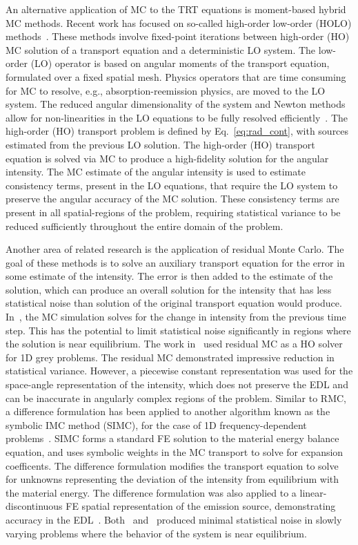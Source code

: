 An alternative application of MC to the TRT equations is moment-based hybrid MC methods.
Recent work has focused on so-called high-order low-order (HOLO)
methods~\cite{willert,park,rmc,ans_2014}. These methods involve fixed-point
iterations between high-order (HO) MC solution of a transport equation and a deterministic LO
system.  The low-order (LO)
operator is based on angular moments of the transport equation, formulated over a fixed
spatial mesh.  Physics operators that are time consuming for MC
to resolve, e.g., absorption-reemission physics, are moved to the LO
system.  The reduced angular dimensionality of the system and Newton methods allow for non-linearities in the LO equations to be fully
resolved efficiently~\cite{willert,park}.  The high-order (HO) transport problem is defined by 
Eq.~\eqref{eq:rad_cont}, with sources estimated from the previous LO solution.  
The high-order (HO) transport equation is solved via MC to produce a high-fidelity solution for
the angular intensity.  The MC estimate of the angular intensity is used to estimate
consistency terms,
present in the LO equations, that require the LO system to preserve the angular accuracy of the
MC solution.   
These consistency terms are present in all spatial-regions of the problem, requiring
statistical variance to be reduced sufficiently throughout the entire domain of the
problem. 

Another area of related research is the application of
residual Monte Carlo.  The goal of these methods is to solve an auxiliary transport
equation for the error in some estimate of the intensity.  The error is then added to the
estimate of the solution, which can produce an overall solution for the intensity that has
less statistical noise than solution of the original transport equation would produce.  In~\cite{rmc}, the MC simulation
solves for the change in intensity from the previous time step. This has the potential to limit statistical noise
significantly in regions where the solution is near equilibrium.
The work in~\cite{rmc} used residual MC as a HO solver for 1D grey problems. The
  residual MC demonstrated impressive reduction in statistical variance.
  However, a piecewise constant representation was used for the
space-angle representation of the intensity, which
does not preserve the EDL and can be inaccurate in angularly complex regions of the
problem.  Similar to RMC, a difference formulation has been applied to another algorithm known as the symbolic IMC method
(SIMC), for the case of 1D frequency-dependent problems~\cite{simc_const}.  SIMC forms a
standard FE solution to the material energy balance equation, and uses symbolic
weights in the MC transport to solve for expansion coefficents.  The difference
formulation modifies the transport equation to solve for unknowns representing the
deviation of the intensity from
equilibrium with the material energy.  The difference
formulation was also applied to a linear-discontinuous FE spatial
representation of the emission source, demonstrating accuracy in the EDL~\cite{simc}. 
Both~\cite{simc_const} and~\cite{rmc} produced minimal
statistical noise in slowly varying problems where the behavior of the system is near
equilibrium. 

